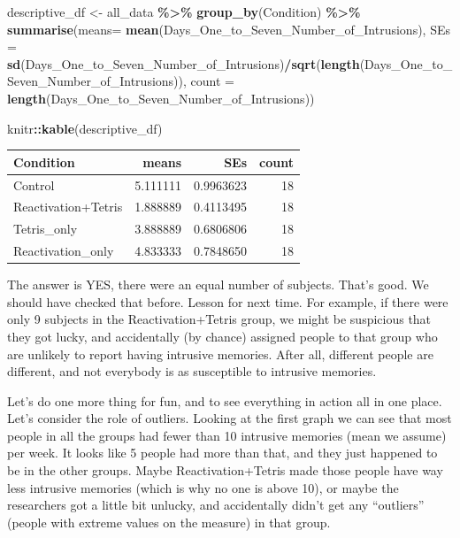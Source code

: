 \documentclass[
]{book}
\newenvironment{Shaded}{\begin{snugshade}}{\end{snugshade}}
\newcommand{\AttributeTok}[1]{\textcolor[rgb]{0.13,0.29,0.53}{#1}}
\newcommand{\FunctionTok}[1]{\textcolor[rgb]{0.13,0.29,0.53}{\textbf{#1}}}
\newcommand{\NormalTok}[1]{#1}
\newcommand{\OtherTok}[1]{\textcolor[rgb]{0.56,0.35,0.01}{#1}}
\newcommand{\SpecialCharTok}[1]{\textcolor[rgb]{0.81,0.36,0.00}{\textbf{#1}}}
\begin{document}
\begin{Shaded}
\begin{Highlighting}[]
\NormalTok{descriptive\_df }\OtherTok{\textless{}{-}}\NormalTok{ all\_data }\SpecialCharTok{\%\textgreater{}\%} 
                    \FunctionTok{group\_by}\NormalTok{(Condition) }\SpecialCharTok{\%\textgreater{}\%} 
                    \FunctionTok{summarise}\NormalTok{(}\AttributeTok{means=} \FunctionTok{mean}\NormalTok{(Days\_One\_to\_Seven\_Number\_of\_Intrusions),}
                              \AttributeTok{SEs =} \FunctionTok{sd}\NormalTok{(Days\_One\_to\_Seven\_Number\_of\_Intrusions)}\SpecialCharTok{/}\FunctionTok{sqrt}\NormalTok{(}\FunctionTok{length}\NormalTok{(Days\_One\_to\_Seven\_Number\_of\_Intrusions)),}
                              \AttributeTok{count =} \FunctionTok{length}\NormalTok{(Days\_One\_to\_Seven\_Number\_of\_Intrusions))}

\NormalTok{knitr}\SpecialCharTok{::}\FunctionTok{kable}\NormalTok{(descriptive\_df)}
\end{Highlighting}
\end{Shaded}

\begin{tabular}{l|r|r|r}
\hline
Condition & means & SEs & count\\
\hline
Control & 5.111111 & 0.9963623 & 18\\
\hline
Reactivation+Tetris & 1.888889 & 0.4113495 & 18\\
\hline
Tetris\_only & 3.888889 & 0.6806806 & 18\\
\hline
Reactivation\_only & 4.833333 & 0.7848650 & 18\\
\hline
\end{tabular}

The answer is YES, there were an equal number of subjects. That's good. We should have checked that before. Lesson for next time. For example, if there were only 9 subjects in the Reactivation+Tetris group, we might be suspicious that they got lucky, and accidentally (by chance) assigned people to that group who are unlikely to report having intrusive memories. After all, different people are different, and not everybody is as susceptible to intrusive memories.

Let's do one more thing for fun, and to see everything in action all in one place. Let's consider the role of outliers. Looking at the first graph we can see that most people in all the groups had fewer than 10 intrusive memories (mean we assume) per week. It looks like 5 people had more than that, and they just happened to be in the other groups. Maybe Reactivation+Tetris made those people have way less intrusive memories (which is why no one is above 10), or maybe the researchers got a little bit unlucky, and accidentally didn't get any ``outliers'' (people with extreme values on the measure) in that group.
\end{document}
